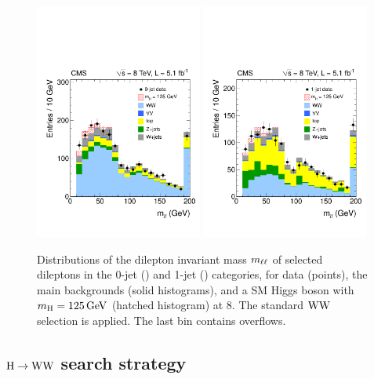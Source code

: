\documentclass[11pt,twoside,a4paper,cmspaper,final,collab]{cms-tdr}
\begin{document}
\begin{figure}[h!t]
\begin{center}
   \includegraphics[width=0.49\textwidth]{figures/hww_wwpresel_0j_mh125_massll.pdf}
   \includegraphics[width=0.49\textwidth]{figures/hww_wwpresel_1j_mh125_massll.pdf}
	\caption{Distributions of the dilepton invariant mass $m_{\ell\ell}$ of selected dileptons
	in the 0-jet (\cmsLeft) and 1-jet (\cmsRight) categories, for data (points),
the main backgrounds (solid histograms), and a SM Higgs boson with $m_{\mathrm{H}}= 125\,\text{Ge\hspace{-.08em}V}$
(hatched histogram) at 8\TeV. The standard $\mathrm{W}\mathrm{W}$
selection is applied. The last bin contains overflows.}  \label{fig:wwpresel_nj_mh125_massll}
\end{center}
\end{figure}

\subsection{\texorpdfstring{$\mathrm{H} \to \mathrm{W}\mathrm{W}$}{Higgs to WW} search strategy}
\label{sec:hww}
\end{document}
